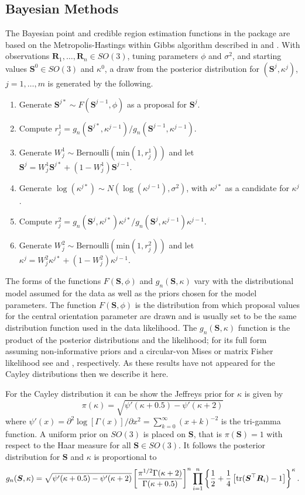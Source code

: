 \subsection{Bayesian Methods}

The Bayesian point and credible region estimation functions in the  package are based on the Metropolis-Hastings within Gibbs algorithm described in \cite{bingham2009bayes} and \cite{bingham2010}.  With observations $\bm R_1,\dots,\bm R_n\in SO(3)$, tuning parameters $\phi$ and $\sigma^2$, and starting values $\bm S^0\in SO(3)$ and $\kappa^0$, a draw from the posterior distribution for $(\bm S^j,\kappa^j)$, $j=1,\dots,m$ is generated by the following.
\begin{enumerate}
\item Generate $\bm S^{j*}\sim F(\bm S^{j-1},\phi)$ as a proposal for $\bm S^j$.  
\item Compute $r_j^1=g_n(\bm S^{j*},\kappa^{j-1})/g_n(\bm S^{j-1},\kappa^{j-1})$.  
\item Generate $W_j^1\sim\text{Bernoulli}(\text{min}(1,r_j^1))$ and let $\bm S^j=W_j^1\bm S^{j*}+(1-W_j^1)\bm S^{j-1}$.
\item Generate $\log(\kappa^{j*})\sim N(\log(\kappa^{j-1}),\sigma^2)$, with $\kappa^{j*}$ as a candidate for $\kappa^j$.  
\item Compute $r_j^2=g_n(\bm S^{j},\kappa^{j*})\kappa^{j*}/g_n(\bm S^{j},\kappa^{j-1})\kappa^{j-1}$.  
\item Generate $W_j^2\sim\text{Bernoulli}(\text{min}(1,r_j^2))$ and let $\kappa^j=W_j^2\kappa^{j*}+(1-W_j^2)\kappa^{j-1}$. 
\end{enumerate}

The forms of the functions $F(\bm S,\phi)$ and  $g_n(\bm S,\kappa)$ vary with the distributional model assumed for the data as well as the priors chosen for the model parameters.  The function $F(\bm S,\phi)$ is the distribution from which proposal values for the central orientation parameter are drawn and is usually set to be the same distribution function used in the data likelihood.  The $g_n(\bm S,\kappa)$ function is the product of the posterior distributions and the likelihood; for its full form assuming non-informative priors and a circular-von Mises or matrix Fisher likelihood see \cite{bingham2009bayes} and \cite{bingham2010b}, respectively.  As these results have not appeared for the Cayley distributions then we describe it here.

For the Cayley distribution it can be show the Jeffreys prior for $\kappa$ is given by
\[
\pi(\kappa)=\sqrt{\psi'(\kappa+0.5)-\psi'(\kappa+2)}
\]
where $\psi'(x)=\partial^2\log[\Gamma(x)]/\partial x^2=\sum_{k=0}^\infty (x+k)^{-2}$ is the tri-gamma function.  A uniform prior on $SO(3)$ is placed on $\bm S$, that is $\pi(\bm S)=1$ with respect to the Haar measure for all $\bm S\in SO(3)$. It follows the posterior distribution for $\bm S$ and $\kappa$ is proportional to
\[
g_n(\bm S,\kappa)=\sqrt{\psi'(\kappa+0.5)-\psi'(\kappa+2)}\left[\frac{\pi^{1/2}\Gamma(\kappa+2)}{\Gamma(\kappa+0.5)}\right]^n\prod_{i=1}^n\left\{\frac{1}{2}+\frac{1}{4}\left[\text{tr}(\bm S^\top\bm R_i)-1\right] \right\}^\kappa.
\]

